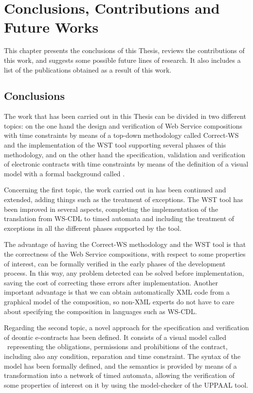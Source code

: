 \chapter{Conclusions, Contributions and Future Works}\label{chapter:c5}

This chapter presents the conclusions of this Thesis, reviews the contributions of this work, and suggests some possible future lines of research. It also includes a list of the publications obtained as a result of this work.

\section{Conclusions}\label{conclusions}

The work that has been carried out in this Thesis can be divided in two different topics: on the one hand the design and verification of Web Service compositions with time constraints by means of a top-down methodology called Correct-WS and the implementation of the WST tool supporting several phases of this methodology, and on the other hand the specification, validation and verification of electronic contracts with time constraints by means of the definition of a visual model with a formal background called \codiag.

Concerning the first topic, the work carried out in \cite{Cambronero2007} has been continued and extended, adding things such as the treatment of exceptions. The WST tool has been improved in several aspects, completing the implementation of the translation from WS-CDL to timed automata and including the treatment of exceptions in all the different phases supported by the tool.

The advantage of having the Correct-WS methodology and the WST tool is that the correctness of the Web Service compositions, with respect to some properties of interest, can be formally verified in the early phases of the development process. In this way, any problem detected can be solved before implementation, saving the cost of correcting these errors after implementation.
Another important advantage is that we can obtain automatically XML code from a graphical model of the composition, so non-XML experts do not have to care about specifying the composition in languages such as WS-CDL.

Regarding the second topic, a novel approach for the specification and verification of deontic e-contracts has been defined. It consists of a visual model called \codiag\ representing the obligations, permissions and prohibitions of the contract, including also any condition, reparation and time constraint. The syntax of the model has been formally defined, and the semantics is provided by means of a transformation into a network of timed automata, allowing the verification of some properties of interest on it by using the model-checker of the UPPAAL tool.

